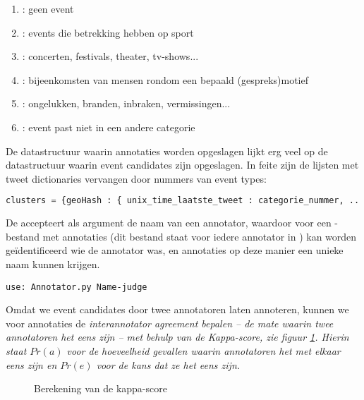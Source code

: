 {{\begin{enumerate}
\item {}: geen event
\item {}: events die betrekking hebben op sport
\item {}: concerten, festivals, theater, tv-shows...
\item {}: bijeenkomsten van mensen rondom een bepaald (gespreks)motief
\item {}: ongelukken, branden, inbraken, vermissingen...
\item {}: event past niet in een andere categorie
\end{enumerate}

De datastructuur waarin annotaties worden opgeslagen lijkt erg veel op de 
datastructuur waarin event candidates zijn opgeslagen. In feite zijn de lijsten 
met tweet dictionaries vervangen door nummers van event types:

\begin{lstlisting}[language=Python]
clusters = {geoHash : { unix_time_laatste_tweet : categorie_nummer, ... }, ... }
\end{lstlisting}

De  accepteert als argument de naam van een annotator, waardoor voor 
een -bestand met annotaties (dit bestand staat voor iedere annotator in 
) kan worden ge\"identificeerd wie de 
annotator was, en annotaties op deze manier een unieke naam kunnen krijgen.

\begin{lstlisting}
use: Annotator.py Name-judge
\end{lstlisting}
\vspace*{-10pt}

\label{AnnotationEvaluation}

Omdat we event candidates door twee annotatoren laten annoteren, kunnen we voor 
annotaties de \it{interannotator agreement} bepalen – de mate waarin twee annotatoren 
het eens zijn – met behulp van de \it{Kappa-score}, zie figuur \ref{kappa}. Hierin staat $Pr(a)$ 
voor de hoeveelheid gevallen waarin annotatoren het met elkaar eens zijn en 
$Pr(e)$ voor de kans dat ze het eens zijn.

\begin{figure}[H]
  \centering
    \caption{Berekening van de kappa-score}
  \label{kappa}
\end{figure}

}}
